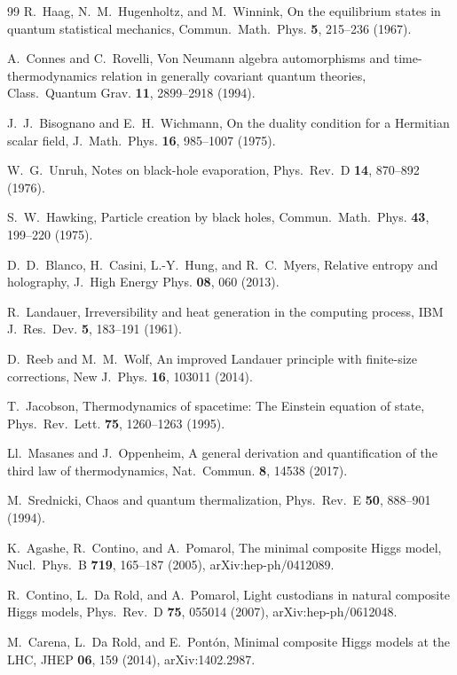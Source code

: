 \documentclass[aps,pra,onecolumn,superscriptaddress,nofootinbib,10pt]{revtex4-2}
\theoremstyle{definition}
\theoremstyle{remark}
\begin{document}
\begin{thebibliography}{99}
 R.~Haag, N.~M.~Hugenholtz, and M.~Winnink, On the equilibrium states in quantum statistical mechanics, Commun.\ Math.\ Phys. \textbf{5}, 215--236 (1967).

 A.~Connes and C.~Rovelli, Von Neumann algebra automorphisms and time-thermodynamics relation in generally covariant quantum theories, Class.\ Quantum Grav. \textbf{11}, 2899--2918 (1994).

 J.~J.~Bisognano and E.~H.~Wichmann, On the duality condition for a Hermitian scalar field, J.\ Math.\ Phys. \textbf{16}, 985--1007 (1975).

 W.~G.~Unruh, Notes on black-hole evaporation, Phys.\ Rev.\ D \textbf{14}, 870--892 (1976).

 S.~W.~Hawking, Particle creation by black holes, Commun.\ Math.\ Phys. \textbf{43}, 199--220 (1975).

 D.~D.~Blanco, H.~Casini, L.-Y.~Hung, and R.~C.~Myers, Relative entropy and holography, J.\ High Energy Phys. \textbf{08}, 060 (2013).

 R.~Landauer, Irreversibility and heat generation in the computing process, IBM J.\ Res.\ Dev. \textbf{5}, 183--191 (1961).

 D.~Reeb and M.~M.~Wolf, An improved Landauer principle with finite-size corrections, New J.\ Phys. \textbf{16}, 103011 (2014).

 T.~Jacobson, Thermodynamics of spacetime: The Einstein equation of state, Phys.\ Rev.\ Lett. \textbf{75}, 1260--1263 (1995).

 Ll.~Masanes and J.~Oppenheim, A general derivation and quantification of the third law of thermodynamics, Nat.\ Commun. \textbf{8}, 14538 (2017).

 M.~Srednicki, Chaos and quantum thermalization, Phys.\ Rev.\ E \textbf{50}, 888--901 (1994).

 K.~Agashe, R.~Contino, and A.~Pomarol, The minimal composite Higgs model, Nucl.\ Phys.\ B \textbf{719}, 165--187 (2005), arXiv:hep-ph/0412089.

 R.~Contino, L.~Da Rold, and A.~Pomarol, Light custodians in natural composite Higgs models, Phys.\ Rev.\ D \textbf{75}, 055014 (2007), arXiv:hep-ph/0612048.

 M.~Carena, L.~Da Rold, and E.~Pont\'on, Minimal composite Higgs models at the LHC, JHEP \textbf{06}, 159 (2014), arXiv:1402.2987.


\end{thebibliography}
\end{document}
